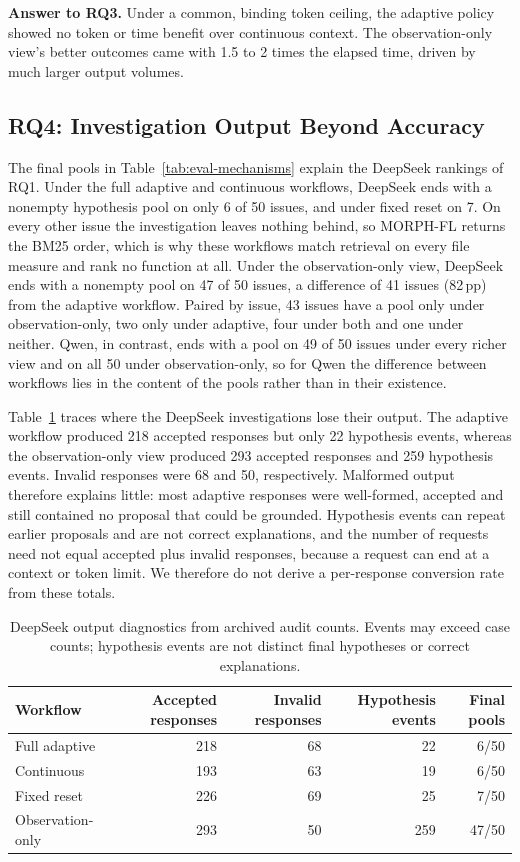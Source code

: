 \documentclass[a4paper,fleqn]{cas-sc}
\newcommand{\tool}{MORPH-FL}
\begin{document}
\noindent\textbf{Answer to RQ3.} Under a common, binding token ceiling, the adaptive policy showed no token or time benefit over continuous context. The observation-only view's better outcomes came with 1.5 to 2 times the elapsed time, driven by much larger output volumes.

\subsection{RQ4: Investigation Output Beyond Accuracy}\label{sec:rq4}
The final pools in Table~\ref{tab:eval-mechanisms} explain the DeepSeek rankings of RQ1. Under the full adaptive and continuous workflows, DeepSeek ends with a nonempty hypothesis pool on only 6 of 50 issues, and under fixed reset on 7. On every other issue the investigation leaves nothing behind, so \tool{} returns the BM25 order, which is why these workflows match retrieval on every file measure and rank no function at all. Under the observation-only view, DeepSeek ends with a nonempty pool on 47 of 50 issues, a difference of 41 issues (82\,pp) from the adaptive workflow. Paired by issue, 43 issues have a pool only under observation-only, two only under adaptive, four under both and one under neither. Qwen, in contrast, ends with a pool on 49 of 50 issues under every richer view and on all 50 under observation-only, so for Qwen the difference between workflows lies in the content of the pools rather than in their existence.

Table~\ref{tab:eval-pilot} traces where the DeepSeek investigations lose their output. The adaptive workflow produced 218 accepted responses but only 22 hypothesis events, whereas the observation-only view produced 293 accepted responses and 259 hypothesis events. Invalid responses were 68 and 50, respectively. Malformed output therefore explains little: most adaptive responses were well-formed, accepted and still contained no proposal that could be grounded. Hypothesis events can repeat earlier proposals and are not correct explanations, and the number of requests need not equal accepted plus invalid responses, because a request can end at a context or token limit. We therefore do not derive a per-response conversion rate from these totals.

\begin{table}[pos=!htbp]
\caption{DeepSeek output diagnostics from archived audit counts. Events may exceed case counts; hypothesis events are not distinct final hypotheses or correct explanations.}\label{tab:eval-pilot}
\centering\small
\begin{tabular*}{\textwidth}{@{\extracolsep{\fill}}lrrrr@{}}\toprule
Workflow & Accepted responses & Invalid responses & Hypothesis events & Final pools\\\midrule
Full adaptive & 218 & 68 & 22 & 6/50\\
Continuous & 193 & 63 & 19 & 6/50\\
Fixed reset & 226 & 69 & 25 & 7/50\\
Observation-only & 293 & 50 & 259 & 47/50\\
\bottomrule\end{tabular*}
\end{table}
\end{document}
